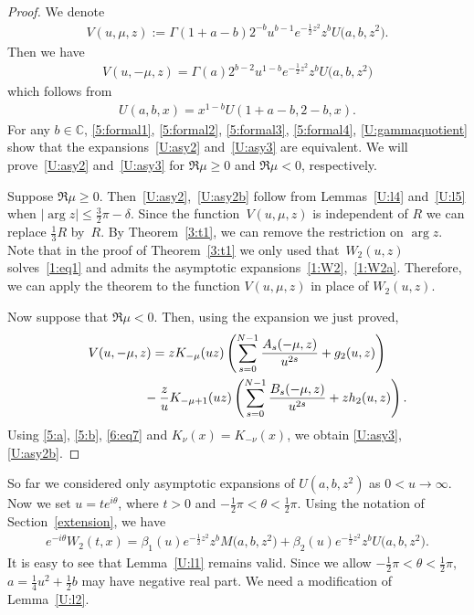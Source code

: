 \documentclass[pdftex]{sigma}
\newcommand{\C}{\mathbb{C}}
\numberwithin{equation}{section}
\begin{document}
\begin{proof}
We denote
\begin{gather*} V(u,\mu,z):=\Gamma(1+a-b)2^{-b}u^{b-1}e^{-\frac12z^2}z^b U\big(a,b,z^2\big).\end{gather*}
Then we have
\begin{gather*}%
 V(u,-\mu,z)=\Gamma(a)2^{b-2}u^{1-b}e^{-\tfrac12 z^2} z^b U\big(a,b,z^2\big)
\end{gather*}
which follows from
\cite[(13.2.40)]{NIST}
\begin{gather*}%
U(a,b,x)=x^{1-b}U(1+a-b,2-b,x).
\end{gather*}
For any $b\in\C$, \eqref{5:formal1}, \eqref{5:formal2}, \eqref{5:formal3}, \eqref{5:formal4}, \eqref{U:gammaquotient}
show that the expansions~\eqref{U:asy2} and~\eqref{U:asy3} are equivalent.
We will prove~\eqref{U:asy2} and~\eqref{U:asy3} for $\Re \mu\ge 0$ and $\Re \mu<0$, respectively.

Suppose $\Re \mu\ge 0$. Then~\eqref{U:asy2},~\eqref{U:asy2b}
follow from Lemmas~\ref{U:l4} and~\ref{U:l5} when $|\arg z|\le \frac32 \pi-\delta$.
Since the function~$V(u,\mu,z)$ is independent of $R$ we can replace $\frac13 R$ by~$R$.
By Theorem~\ref{3:t1}, we can remove the restriction on $\arg z$.
Note that in the proof of Theorem~\ref{3:t1} we only used that~$W_2(u,z)$ solves~\eqref{1:eq1} and admits the asymptotic expansions~\eqref{1:W2},~\eqref{1:W2a}. Therefore, we can apply
the theorem to the function $V(u,\mu,z)$ in place of $W_2(u,z)$.

Now suppose that $\Re \mu<0$.
Then, using the expansion we just proved,
\begin{gather*}
 V(u,-\mu,z) = zK_{-\mu}(uz)\left(\sum_{s=0}^{N-1} \frac{A_s(-\mu,z)}{u^{2s}}+g_2(u,z)\right)\nonumber \\
\hphantom{V(u,-\mu,z) =}{} -\frac{z}{u}K_{-\mu+1}(uz)\left(\sum_{s=0}^{N-1} \frac{B_s(-\mu,z)}{u^{2s}}+zh_2(u,z)\right).%
\end{gather*}
Using \eqref{5:a}, \eqref{5:b}, \eqref{6:eq7} and $K_\nu(x)=K_{-\nu}(x)$, we obtain \eqref{U:asy3}, \eqref{U:asy2b}.
\end{proof}

So far we considered only asymptotic expansions of $U(a,b,z^2)$ as $0<u\to\infty$.
Now we set $u=te^{i\theta}$, where $t>0$ and $-\frac12\pi<\theta<\frac12\pi$.
Using the notation of Section~\ref{extension}, we have
\begin{gather*}%
 e^{-i\theta}W_2(t,x)=\beta_1(u) e^{-\frac12z^2}z^b M\big(a,b,z^2\big)+\beta_2(u) e^{-\frac12z^2}z^b U\big(a,b,z^2\big) .
\end{gather*}
It is easy to see that Lemma~\ref{U:l1} remains valid.
Since we allow $-\frac12\pi<\theta<\frac12\pi$, $a=\frac14u^2+\frac12b$ may have negative real part. We need a modif\/ication of Lemma~\ref{U:l2}.
\end{document}
